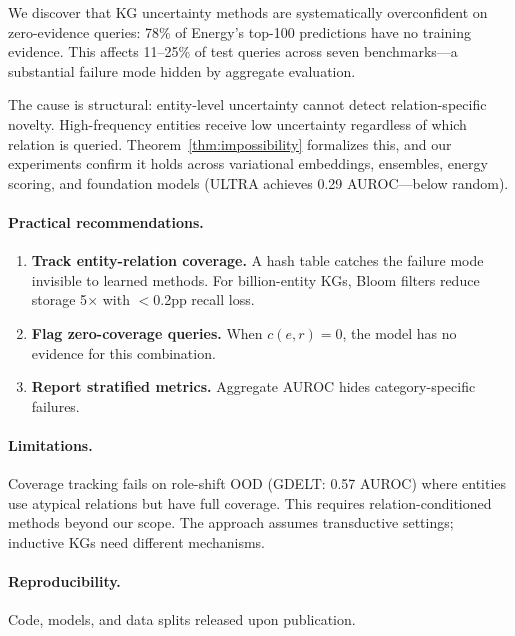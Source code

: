 
We discover that KG uncertainty methods are systematically overconfident on zero-evidence queries: 78\% of Energy's top-100 predictions have no training evidence. This affects 11--25\% of test queries across seven benchmarks---a substantial failure mode hidden by aggregate evaluation.

The cause is structural: entity-level uncertainty cannot detect relation-specific novelty. High-frequency entities receive low uncertainty regardless of which relation is queried. Theorem~\ref{thm:impossibility} formalizes this, and our experiments confirm it holds across variational embeddings, ensembles, energy scoring, and foundation models (ULTRA achieves 0.29 AUROC---below random).

\paragraph{Practical recommendations.}
\begin{enumerate}
\item \textbf{Track entity-relation coverage.} A hash table catches the failure mode invisible to learned methods. For billion-entity KGs, Bloom filters reduce storage 5$\times$ with $<$0.2pp recall loss.
\item \textbf{Flag zero-coverage queries.} When $c(e,r)=0$, the model has no evidence for this combination.
\item \textbf{Report stratified metrics.} Aggregate AUROC hides category-specific failures.
\end{enumerate}

\paragraph{Limitations.}
Coverage tracking fails on role-shift OOD (GDELT: 0.57 AUROC) where entities use atypical relations but have full coverage. This requires relation-conditioned methods beyond our scope. The approach assumes transductive settings; inductive KGs need different mechanisms.

\paragraph{Reproducibility.}
Code, models, and data splits released upon publication.
